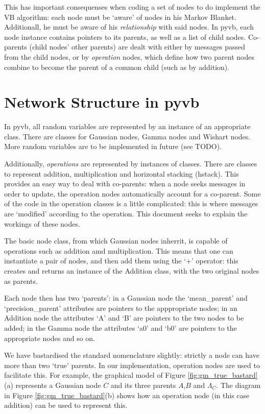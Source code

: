 \documentclass{article}
\newcommand{\<}{\langle}
\renewcommand{\>}{\rangle}
\begin{document}
This has important consequenses when coding a set of nodes to do implement the VB algorithm: each node must be `aware' of nodes in his Markov Blanket. Additionall, he must be aware of his {\em relationship} with said nodes. In pyvb, each node instance contains pointers to its parents, as well as a list of child nodes.  Co-parents (child nodes' other parents) are dealt with either by messages passed from the child nodes, or by {\em operation} nodes, which define how two parent nodes combine to become the parent of a common child (such as by addition).  

\section{Network Structure in pyvb}
In pyvb, all random variables are represented by an instance of an appropriate class. There are classes for Gaussian nodes, Gamma nodes and Wishart nodes. More random variables are to be implemented in future (see TODO).

Additionally, {\em operations} are represented by instances of classes. There are classes to represent addition, multiplication and horizontal stacking (hstack).  This provides an easy way to deal with co-parents: when a node seeks messages in order to update, the operation nodes automatically account for a co-parent. Some of the code in the operation classes is a little complicated: this is where messages are `modified' according to the operation.  This document seeks to explain the workings of these nodes.   

The basic node class, from which Gaussian nodes inherrit, is capable of operations such as addition amd multiplication. This means that one can instantiate a pair of nodes, and then add them using the `+' operator: this creates and returns an instance of the Addition class, with the two original nodes as parents. 

Each node then has two `parents': in a Gaussian node the `mean\_parent' and `precision\_parent' attributes are pointers to the apppropriate nodes; in an Addition node the attributes `A' and `B' are pointers to the two nodes to be added; in the Gamma node the attributes `a0' and `b0' are pointers to the appropriate nodes and so on.

We have bastardised the standard nomenclature slightly: strictly a node can have more than two `true' parents. In our implementation, operation nodes are used to facilitate this. For example, the graphical model of Figure \ref{fig:gm_true_bastard}(a) represents a Gaussian node $C$ and its three parents $A$,$B$ and $\Lambda_C$.  The diagram in Figure \ref{fig:gm_true_bastard}(b) shows how an operation node (in this case addition) can be used to represent this. 
\end{document}
